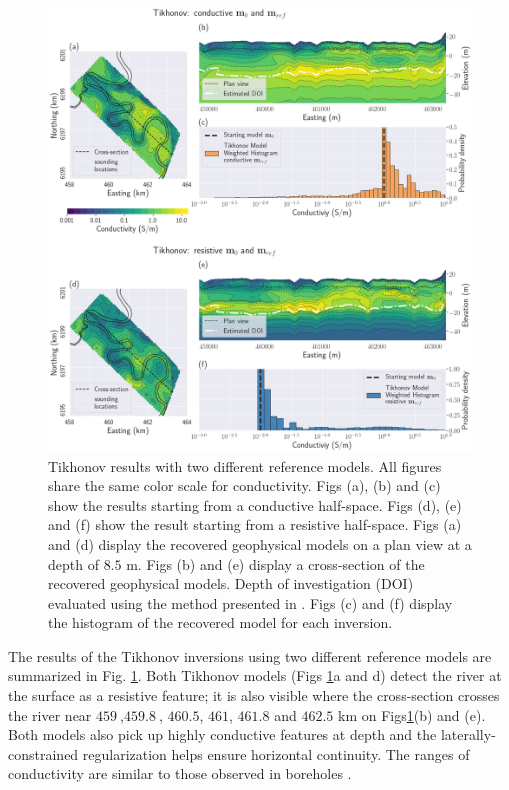 \documentclass[extra]{gji} %
\begin{document}
\begin{figure}
\centering
\includegraphics[width=\textwidth]{Fig/LowRes/Booky_L2_Results.png}
\caption{Tikhonov results with two different reference models. All figures share the same color scale for conductivity. Figs (a), (b) and (c) show the results starting from a conductive half-space. Figs (d), (e) and (f) show the result starting from a resistive half-space. Figs (a) and (d) display the recovered geophysical models on a plan view at a depth of $8.5$ m. Figs (b) and (e) display a cross-section of the recovered geophysical models. Depth of investigation (DOI) evaluated using the method presented in \cite{DOI}. Figs (c) and (f) display the histogram of the recovered model for each inversion.}
\label{fig:Book_L2_Results}
\end{figure}

The results of the Tikhonov inversions using two different reference models are summarized in Fig. \ref{fig:Book_L2_Results}. Both Tikhonov models (Figs \ref{fig:Book_L2_Results}a and d) detect the river at the surface as a resistive feature; it is also visible where the cross-section crosses the river near $459~$,$459.8~$, $460.5$, $461$, $461.8$ and $462.5$ km on Figs\ref{fig:Book_L2_Results}(b) and (e). Both models also pick up highly conductive features at depth and the laterally-constrained regularization helps ensure horizontal continuity. The ranges of conductivity are similar to those observed in boreholes \citep{BookyExperiment}.
\end{document}
